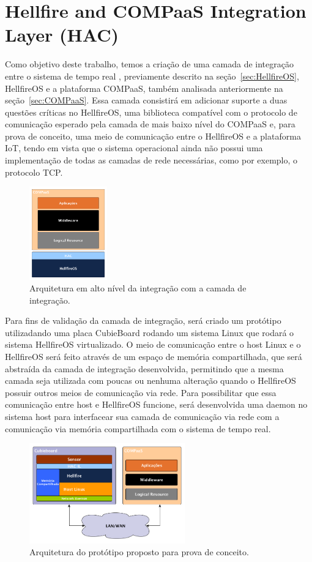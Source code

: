 \section{Hellfire and COMPaaS Integration Layer (HAC)}
\label{sec:HAC}
Como objetivo deste trabalho, temos a criação de uma camada de integração entre o sistema de tempo real
, previamente descrito na seção~\ref{sec:HellfireOS}, HellfireOS e a plataforma COMPaaS, também analisada
anteriormente na seção~\ref{sec:COMPaaS}. Essa camada consistirá em adicionar suporte a duas questões
críticas no HellfireOS, uma biblioteca compatível com o protocolo de comunicação esperado pela camada de
mais baixo nível do COMPaaS e, para prova de conceito, uma meio de comunicação entre o HellfireOS e a
plataforma IoT, tendo em vista que o sistema operacional ainda não possui uma implementação de todas as
camadas de rede necessárias, como por exemplo, o protocolo TCP.

\begin{figure}[H]
	\centering
		\includegraphics[width=0.3\textwidth]{fig/COMPaaS_HF.png}
	\caption{Arquitetura em alto nível da integração com a camada de integração.}
\end{figure}

Para fins de validação da camada de integração, será criado um protótipo utilizadando uma placa
CubieBoard rodando um sistema Linux que rodará o sistema HellfireOS virtualizado. O meio de comunicação
entre o host Linux e o HellfireOS será feito através de um espaço de memória compartilhada, que será
abstraída da camada de integração desenvolvida, permitindo que a mesma camada seja utilizada com
poucas ou nenhuma alteração quando o HellfireOS possuir outros meios de comunicação via rede.
Para possibilitar que essa comunicação entre host e HellfireOS funcione, será desenvolvida uma
daemon no sistema host para interfacear sua camada de comunicação via rede com a comunicação
via memória compartilhada com o sistema de tempo real.

\begin{figure}[H]
	\centering
		\includegraphics[width=0.6\textwidth]{fig/HAC_IL.png}
	\caption{Arquitetura do protótipo proposto para prova de conceito.}
\end{figure}

